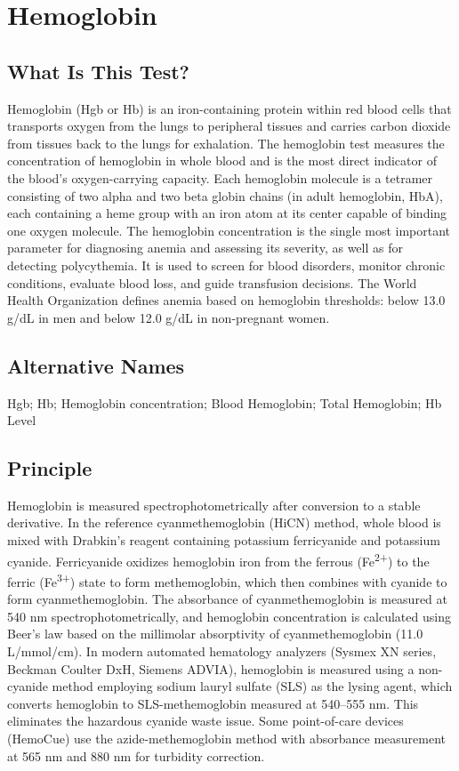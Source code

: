 \chapter{Hemoglobin}

\section*{What Is This Test?}
Hemoglobin (Hgb or Hb) is an iron-containing protein within red blood cells that transports oxygen from the lungs to peripheral tissues and carries carbon dioxide from tissues back to the lungs for exhalation. The hemoglobin test measures the concentration of hemoglobin in whole blood and is the most direct indicator of the blood's oxygen-carrying capacity. Each hemoglobin molecule is a tetramer consisting of two alpha and two beta globin chains (in adult hemoglobin, HbA), each containing a heme group with an iron atom at its center capable of binding one oxygen molecule. The hemoglobin concentration is the single most important parameter for diagnosing anemia and assessing its severity, as well as for detecting polycythemia. It is used to screen for blood disorders, monitor chronic conditions, evaluate blood loss, and guide transfusion decisions. The World Health Organization defines anemia based on hemoglobin thresholds: below 13.0 g/dL in men and below 12.0 g/dL in non-pregnant women.

\section*{Alternative Names}
Hgb; Hb; Hemoglobin concentration; Blood Hemoglobin; Total Hemoglobin; Hb Level

\section*{Principle}
Hemoglobin is measured spectrophotometrically after conversion to a stable derivative. In the reference cyanmethemoglobin (HiCN) method, whole blood is mixed with Drabkin's reagent containing potassium ferricyanide and potassium cyanide. Ferricyanide oxidizes hemoglobin iron from the ferrous (Fe\textsuperscript{2+}) to the ferric (Fe\textsuperscript{3+}) state to form methemoglobin, which then combines with cyanide to form cyanmethemoglobin. The absorbance of cyanmethemoglobin is measured at 540 nm spectrophotometrically, and hemoglobin concentration is calculated using Beer's law based on the millimolar absorptivity of cyanmethemoglobin (11.0 L/mmol/cm). In modern automated hematology analyzers (Sysmex XN series, Beckman Coulter DxH, Siemens ADVIA), hemoglobin is measured using a non-cyanide method employing sodium lauryl sulfate (SLS) as the lysing agent, which converts hemoglobin to SLS-methemoglobin measured at 540--555 nm. This eliminates the hazardous cyanide waste issue. Some point-of-care devices (HemoCue) use the azide-methemoglobin method with absorbance measurement at 565 nm and 880 nm for turbidity correction.

